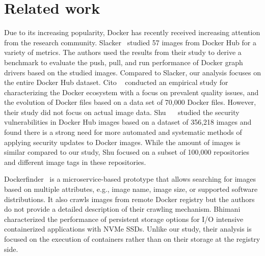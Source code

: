 \section{Related work}
\label{sec:related}


Due to its increasing popularity, Docker has recently received increasing
attention from the research community.
%
Slacker~\cite{slacker} studied 57 images from Docker Hub for a variety of metrics.
The authors used the results from their study to derive a benchmark to evaluate
the push, pull, and run performance of Docker graph drivers based on the studied
images. Compared to Slacker, our analysis focuses on the entire Docker Hub dataset.
%
Cito \etal~\cite{analysisdockergithub} conducted an empirical study for characterizing
the Docker ecosystem with a focus on prevalent quality issues, and the evolution of Docker 
files based on a data set of 70,000 Docker files. However, their study did not focus
on actual image data.
%
Shu \etal~~\cite{dockervulnerabile} studied the security vulnerabilities in Docker Hub
images based on a dataset of 356,218 images and found there is a strong need for more
automated and systematic methods of applying security updates to Docker images. While
the amount of images is similar compared to our study, Shu \etal focused on a subset
of 100,000 repositories and different image tags in these repositories.

Dockerfinder~\cite{dockerfinder} is a microservice-based prototype that allows searching
for images based on  multiple attributes, e.g., image name, image size, or supported software 
distributions. It also crawls images from remote Docker registry but the authors do
not provide a detailed description of their crawling mechanism.
%
Bhimani~\cite{dockerssd} \etal characterized the performance of persistent storage options
for I/O intensive containerized applications with NVMe SSDs. Unlike our study, their analysis
is focused on the execution of containers rather than on their storage at the registry side.

